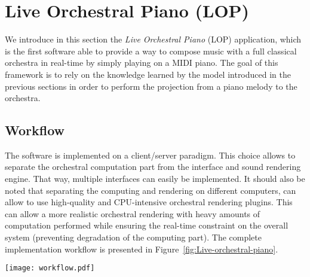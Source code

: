\documentclass{amsart}
\begin{document}
	
	\section{Live Orchestral Piano (LOP)}
	We introduce in this section the \emph{Live Orchestral Piano} (LOP)
	application, which is the first software able to provide a way to
	compose music with a full classical orchestra in real-time by simply
	playing on a MIDI piano. The goal of this framework is to rely on
	the knowledge learned by the model introduced in the previous sections
	in order to perform the projection from a piano melody to the orchestra.
	
	\subsection{Workflow}
	The software is implemented on a client/server paradigm. This choice
	allows to separate the orchestral computation part from the interface
	and sound rendering engine. That way, multiple interfaces can easily
	be implemented. It should also be noted that separating the computing
	and rendering on different computers, can allow to use high-quality
	and CPU-intensive orchestral rendering plugins. This can allow a more
	realistic orchestral rendering with heavy amounts of computation performed
	while ensuring the real-time constraint on the overall system (preventing
	degradation of the computing part). The complete implementation workflow
	is presented in Figure~\ref{fig:Live-orchestral-piano}.
	
	\begin{figure*}
		\begin{centering}
			\texttt{[image: workflow.pdf]}
			\par\end{centering}
		
		\caption{\label{fig:Live-orchestral-piano}Live orchestral piano (L.O.P) implementation
			workflow. The user inputs a melody which is transcribed into a score
			and send via OSC from the Max/Msp client. Then, the MATLAB server
			uses this vector of notes and process it following the aforementioned
			techniques in order to obtain the orchestration. This information
			is then sent back to Max/Msp which performs the real-time audio rendering }
	\end{figure*}
	
\end{document}
